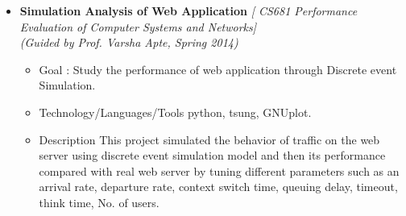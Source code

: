 \begin{itemize}
\item \textbf{Simulation Analysis of Web Application } \emph{[ CS681 Performance Evaluation of Computer Systems and Networks]} \\
	\emph{(Guided by Prof. Varsha Apte, Spring 2014)} \hfill \\[-0.6cm]
	\begin{itemize}
	  \item Goal : Study the performance of web application through Discrete event Simulation. \\[-0.6cm]
	      \item Technology/Languages/Tools  python, tsung, GNUplot. \\[-0.6cm]
	      \item Description 
	      This project simulated the behavior of traffic on the web server using discrete event simulation model and
	      then its performance compared with real web server by tuning different parameters such as an arrival
	      rate, departure rate, context switch time, queuing delay, timeout, think time, No. of users. \\[-0.6cm]
	\end{itemize}
	

\end{itemize}
